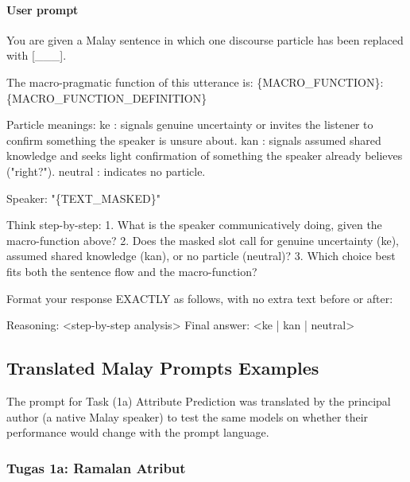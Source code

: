 \documentclass[11pt]{article}
\begin{document}
\paragraph{User prompt}
\begin{PromptBlock}
You are given a Malay sentence in which one discourse particle has been replaced with [\_\_\_].

The macro-pragmatic function of this utterance is:
  \{MACRO\_FUNCTION\}: \{MACRO\_FUNCTION\_DEFINITION\}

Particle meanings:
  ke      : signals genuine uncertainty or invites the listener to confirm something the speaker is unsure about.
  kan     : signals assumed shared knowledge and seeks light confirmation of something the speaker already believes ("right?").
  neutral : indicates no particle.

Speaker:
  "\{TEXT\_MASKED\}"

Think step-by-step:
  1. What is the speaker communicatively doing, given the macro-function above?
  2. Does the masked slot call for genuine uncertainty (ke), assumed shared knowledge (kan), or no particle (neutral)?
  3. Which choice best fits both the sentence flow and the macro-function?

Format your response EXACTLY as follows, with no extra text before or after:

Reasoning: <step-by-step analysis>
Final answer: <ke | kan | neutral>
\end{PromptBlock}


\subsection{Translated Malay Prompts Examples}
The prompt for Task (1a) Attribute Prediction was translated by the principal author (a native Malay speaker) to test the same models on whether their performance would change with the prompt language.

\subsubsection{Tugas 1a: Ramalan Atribut}
\end{document}
